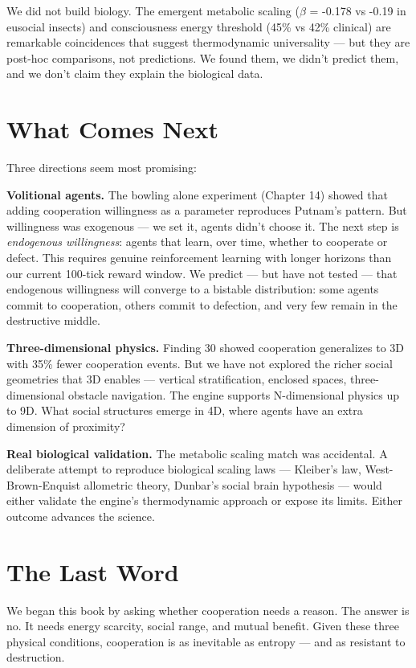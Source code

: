 We did not build biology. The emergent metabolic scaling ($\beta$ = -0.178 vs -0.19 in eusocial insects) and consciousness energy threshold (45\% vs 42\% clinical) are remarkable coincidences that suggest thermodynamic universality --- but they are post-hoc comparisons, not predictions. We found them, we didn't predict them, and we don't claim they explain the biological data.

\section{What Comes Next}\label{what-comes-next}

Three directions seem most promising:

\textbf{Volitional agents.} The bowling alone experiment (Chapter 14) showed that adding cooperation willingness as a parameter reproduces Putnam's pattern. But willingness was exogenous --- we set it, agents didn't choose it. The next step is \emph{endogenous willingness}: agents that learn, over time, whether to cooperate or defect. This requires genuine reinforcement learning with longer horizons than our current 100-tick reward window. We predict --- but have not tested --- that endogenous willingness will converge to a bistable distribution: some agents commit to cooperation, others commit to defection, and very few remain in the destructive middle.

\textbf{Three-dimensional physics.} Finding 30 showed cooperation generalizes to 3D with 35\% fewer cooperation events. But we have not explored the richer social geometries that 3D enables --- vertical stratification, enclosed spaces, three-dimensional obstacle navigation. The engine supports N-dimensional physics up to 9D. What social structures emerge in 4D, where agents have an extra dimension of proximity?

\textbf{Real biological validation.} The metabolic scaling match was accidental. A deliberate attempt to reproduce biological scaling laws --- Kleiber's law, West-Brown-Enquist allometric theory, Dunbar's social brain hypothesis --- would either validate the engine's thermodynamic approach or expose its limits. Either outcome advances the science.

\section{The Last Word}\label{the-last-word}

We began this book by asking whether cooperation needs a reason. The answer is no. It needs energy scarcity, social range, and mutual benefit. Given these three physical conditions, cooperation is as inevitable as entropy --- and as resistant to destruction.

